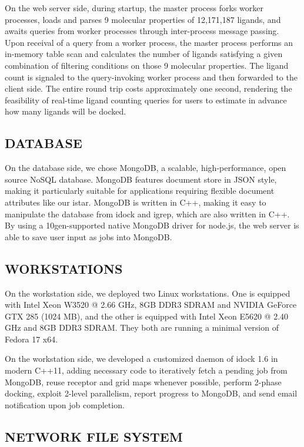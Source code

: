 \documentclass[12pt]{article}
\begin{document}
On the web server side, during startup, the master process forks worker processes, loads and parses 9 molecular properties of 12,171,187 ligands, and awaits queries from worker processes through inter-process message passing. Upon receival of a query from a worker process, the master process performs an in-memory table scan and calculates the number of ligands satisfying a given combination of filtering conditions on those 9 molecular properties. The ligand count is signaled to the query-invoking worker process and then forwarded to the client side. The entire round trip costs approximately one second, rendering the feasibility of real-time ligand counting queries for users to estimate in advance how many ligands will be docked.

\subsection*{\sffamily \large DATABASE}

On the database side, we chose MongoDB, a scalable, high-performance, open source NoSQL database. MongoDB features document store in JSON style, making it particularly suitable for applications requiring flexible document attributes like our istar. MongoDB is written in C++, making it easy to manipulate the database from idock and igrep, which are also written in C++. By using a 10gen-supported native MongoDB driver for node.js, the web server is able to save user input as jobs into MongoDB.

\subsection*{\sffamily \large WORKSTATIONS}

On the workstation side, we deployed two Linux workstations. One is equipped with Intel Xeon W3520 @ 2.66 GHz, 8GB DDR3 SDRAM and NVIDIA GeForce GTX 285 (1024 MB), and the other is equipped with Intel Xeon E5620 @ 2.40 GHz and 8GB DDR3 SDRAM. They both are running a minimal version of Fedora 17 x64.

On the workstation side, we developed a customized daemon of idock 1.6 in modern C++11, adding necessary code to iteratively fetch a pending job from MongoDB, reuse receptor and grid maps whenever possible, perform 2-phase docking, exploit 2-level parallelism, report progress to MongoDB, and send email notification upon job completion.

\subsection*{\sffamily \large NETWORK FILE SYSTEM}
\end{document}
